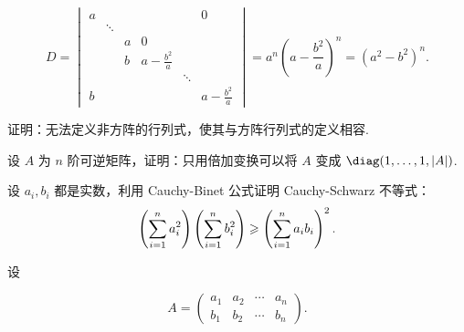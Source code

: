 \begin{exercise}
\begin{exgroup}
\begin{answer}
\begin{enumerate}
                    \[
                        D = \begin{vmatrix}
                            a &         &   &                   &         & 0                 \\
                              & \ddots  &   &                   &         &                   \\
                              &         & a & 0                 &         &                   \\
                              &         & b & a - \frac{b^2}{a} &         &                   \\
                              &         &   &                   & \ddots  &                   \\
                            b &         &   &                   &         & a - \frac{b^2}{a}
                        \end{vmatrix}
                        = a^n (a - \frac{b^2}{a})^n
                        = (a^2 - b^2)^n.
                    \]
            \end{enumerate}
        \end{answer}
    \end{exgroup}

    \begin{exgroup}
        \item 证明：无法定义非方阵的行列式，使其与方阵行列式的定义相容.
        \begin{answer}

        \end{answer}

        \item 设 $A$ 为 $n$ 阶可逆矩阵，证明：只用倍加变换可以将 $A$ 变成 $\diag(1,\ldots,1,|A|)$.
        \begin{answer}

        \end{answer}

        \item 设 $a_i, b_i$ 都是实数，利用 Cauchy-Binet 公式证明 Cauchy-Schwarz 不等式：
        \[
            \left( \sum_{i=1}^{n}\limits a_i^2 \right) \left( \sum_{i=1}^{n}\limits b_i^2 \right) \geqslant \left( \sum_{i=1}^{n}\limits a_i b_i \right)^2.
        \]
        \begin{answer}
            设

            \[
                A = \begin{pmatrix}
                    a_1 & a_2 & \cdots & a_n \\
                    b_1 & b_2 & \cdots & b_n
                \end{pmatrix}.
            \]


\end{answer}
\end{exgroup}
\end{exercise}

